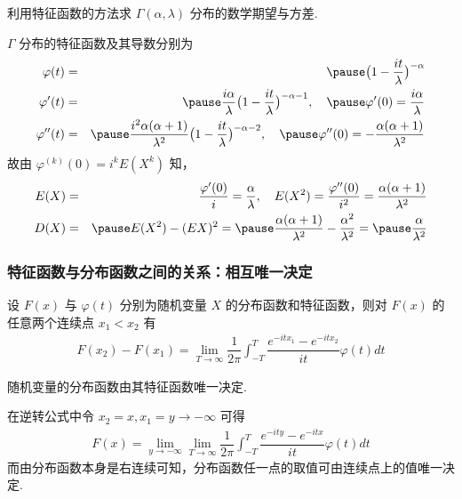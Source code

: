 \documentclass[Prob-All.tex]{subfiles}
\begin{document}
\begin{frame}
	\begin{exam}
		利用特征函数的方法求 $\Gamma (\alpha,\lambda)$ 分布的数学期望与方差.
	\end{exam}

	\pause
	\jieda $\Gamma$ 分布的特征函数及其导数分别为
	\begin{eqnarray*}
		\varphi(t)&=&\pause \big(1-\dfrac{it}{\lambda}\big)^{-\alpha}\\
		\varphi'(t)&=&\pause \dfrac{i\alpha}{\lambda}\big(1-\dfrac{it}{\lambda}\big)^{-\alpha-1},\quad \pause \varphi'(0)=\dfrac{i\alpha}{\lambda}\\
		\varphi''(t)&=&\pause \dfrac{i^2\alpha(\alpha+1)}{\lambda^2}\big(1-\dfrac{it}{\lambda}\big)^{-\alpha-2}, \quad \pause \varphi''(0)=-\dfrac{\alpha(\alpha+1)}{\lambda^2}
	\end{eqnarray*}\pause
	故由 $\varphi^{(k)}(0)=i^kE (X^k)$ 知，\pause
	\begin{eqnarray*}
		E(X)&=&\dfrac{\varphi'(0)}{i}=\dfrac{\alpha}{\lambda},\quad E(X^2)=\dfrac{\varphi''(0)}{i^2}=\dfrac{\alpha(\alpha+1)}{\lambda^2}\\
		D(X)&=&\pause E(X^2)-(EX)^2=\pause \dfrac{\alpha(\alpha+1)}{\lambda^2}-\dfrac{\alpha^2}{\lambda^2}=\pause \dfrac{\alpha}{\lambda^2}
	\end{eqnarray*}

\end{frame}

\begin{frame}
	\frametitle{特征函数与分布函数之间的关系：相互唯一决定}
	\begin{thm}[逆转公式] 设 $F (x)$ 与 $\varphi (t)$ 分别为随机变量 $X$ 的分布函数和特征函数，则对 $F (x)$ 的任意两个连续点 $x_1<x_2$ 有
		\begin{eqnarray*}
			F(x_2)-F(x_1)=\lim_{T\rightarrow\infty}\dfrac{1}{2\pi}\int_{-T}^T\dfrac{e^{-itx_1}-e^{-itx_2}}{it}\varphi(t)dt
		\end{eqnarray*}
	\end{thm}
	\pause
	\begin{thm}[唯一性定理] 随机变量的分布函数由其特征函数唯一决定.
	\end{thm}

	\pause \zheng 在逆转公式中令 $x_2=x, x_1=y\rightarrow -\infty$ 可得
	\begin{eqnarray*}
		F(x)=\lim_{y\rightarrow-\infty}\lim_{T\rightarrow\infty}\dfrac{1}{2\pi}\int_{-T}^T\dfrac{e^{-ity}-e^{-itx}}{it}\varphi(t)dt
	\end{eqnarray*}
	\pause 而由分布函数本身是右连续可知，分布函数任一点的取值可由连续点上的值唯一决定.

\end{frame}
\end{document}
